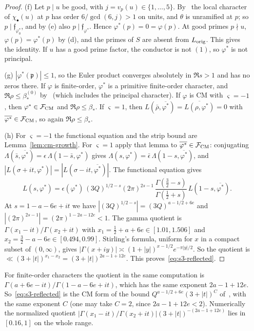 \documentclass[11pt]{article}
\numberwithin{equation}{section}
\begin{document}
\begin{proof}
(f) Let $p\mid u$ be good, with $j=v_p(u)\in\{1,\dots,5\}$. By~\cite[Section~8.1]{OAI78} the local
character of $\chi_\bullet(u)$ at $p$ has order $6/\gcd(6,j)>1$ on units, and $\theta$ is unramified at
$p$; so $p\mid\mathfrak f_{\varphi_0^*}$, and by (e) also $p\mid\mathfrak f_{\varphi^*}$. Hence
$\varphi^*(p)=0=\varphi(p)$. At good primes $p\nmid u$, $\varphi(p)=\varphi^*(p)$ by (d), and the primes of
$S$ are absent from $L_{\rm orig}$. This gives the identity. If $u$ has a good prime factor, the
conductor is not $(1)$, so $\varphi^*$ is not principal.

(g) $|\varphi^*(\mathfrak p)|\le1$, so the Euler product converges absolutely in $\Re s>1$ and has no zeros
there. If $\varphi$ is finite-order, $\varphi^*$ is a primitive finite-order character, and $\Re\rho\le\beta_*^{(0)}$
by~\cite[eq.~(2.1)]{OAI78} (which includes the principal character). If $\varphi$ is CM with
$\varsigma=-1$, then $\varphi^*\in\mathcal F_{\rm CM}$ and $\Re\rho\le\beta_*$. If $\varsigma=1$, then
$L(\bar\rho,\overline{\varphi^*})=\overline{L(\rho,\varphi^*)}=0$ with $\overline{\varphi^*}\in\mathcal F_{\rm CM}$, so
again $\Re\rho\le\beta_*$.

(h) For $\varsigma=-1$ the functional equation and the strip bound are Lemma~\ref{lem:cm-growth}. For
$\varsigma=1$ apply that lemma to $\overline{\varphi^*}\in\mathcal F_{\rm CM}$: conjugating
$\Lambda(\bar s,\overline{\varphi^*})=\epsilon\,\Lambda(1-\bar s,\varphi^*)$ gives
$\Lambda(s,\varphi^*)=\bar\epsilon\,\Lambda(1-s,\overline{\varphi^*})$, and
$|L(\sigma+it,\varphi^*)|=|L(\sigma-it,\overline{\varphi^*})|$. The functional equation gives
\begin{equation}\label{eq:d168}
 L(s,\varphi^*)=\epsilon(\varphi^*)\,(3Q)^{1/2-s}(2\pi)^{2s-1}\,
 \frac{\Gamma(\frac32-s)}{\Gamma(\frac12+s)}\,L(1-s,\overline{\varphi^*}).
\end{equation}
At $s=1-a-6e+it$ we have $|(3Q)^{1/2-s}|=(3Q)^{a-1/2+6e}$ and
$|(2\pi)^{2s-1}|=(2\pi)^{1-2a-12e}<1$. The gamma quotient is $\Gamma(x_1-it)/\Gamma(x_2+it)$ with
$x_1=\frac12+a+6e\in[1.01,1.506]$ and $x_2=\frac32-a-6e\in[0.494,0.99]$. Stirling's formula, uniform
for $x$ in a compact subset of $(0,\infty)$, gives
$|\Gamma(x+iy)|\asymp(1+|y|)^{x-1/2}e^{-\pi|y|/2}$. So the quotient is
$\ll(3+|t|)^{x_1-x_2}=(3+|t|)^{2a-1+12e}$. This proves~\eqref{eq:s3-reflected}.
\end{proof}

For finite-order characters the quotient in the same computation is
$\Gamma(a+6e-it)/\Gamma(1-a-6e+it)$, which has the same exponent $2a-1+12e$. So~\eqref{eq:s3-reflected}
is the CM form of the bound $Q^{a-1/2+6e}(3+|t|)^C$ of~\cite[proof of Lemma~8.1]{OAI78}, with the same exponent
$C$ (one may take $C=2$, since $2a-1+12e<2$). Numerically the normalized quotient
$|\Gamma(x_1-it)/\Gamma(x_2+it)|(3+|t|)^{-(2a-1+12e)}$ lies in $[0.16,1]$ on the whole range.
\end{document}
